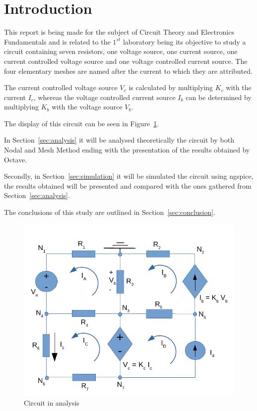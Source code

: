 \section{Introduction}
\label{sec:introduction}


\hspace{0,5cm} This report is being made for the subject of Circuit Theory and Electronics Fundamentals and is related to the $1^{st}$ laboratory being its objective to study a circuit containing seven resistors, one voltage source, one current source, one current controlled voltage source and one voltage controlled current source. The four elementary meshes are named after the current to which they are attributed.

The current controlled voltage source $V_c$ is calculated by multiplying $K_c$ with the current $I_c$, whereas the voltage controlled current source $I_b$ can be determined by multiplying $K_b$ with the voltage source $V_b$.

The display of this circuit can be seen in Figure~\ref{fig:circuito}.

In Section~\ref{sec:analysis} it will be analysed theoretically the circuit by both Nodal and Mesh Method ending with the presentation of the results obtained by Octave.

Secondly, in Section~\ref{sec:simulation} it will be simulated the circuit using ngspice, the results obtained will be presented and compared with the ones gathered from Section~\ref{sec:analysis}.

The conclusions of this study are outlined in Section~\ref{sec:conclusion}.

\begin{figure}[h] \centering
\includegraphics[width=0.7\linewidth]{circuito.pdf}
\caption{Circuit in analysis}
\label{fig:circuito}
\end{figure}


